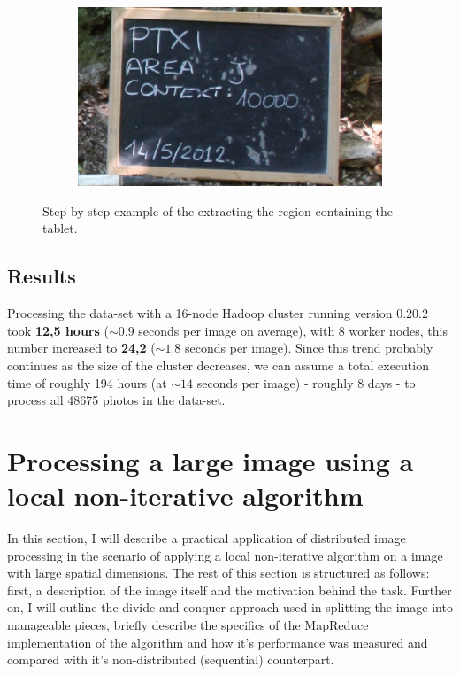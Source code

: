 \documentclass [12pt,a4paper]{report}
\begin{document}
\begin{figure}[h]
\begin{subfigure}{.5\textwidth}
	\caption{}
	\label{fig_bounding_box_small}
\end{subfigure}
\\
\begin{subfigure}{1.0\textwidth}
  \centering
  \includegraphics[scale=0.3]{box_extracted.eps} %
  \caption{}
	\label{fig_box_extracted_small}
\end{subfigure}
\caption{Step-by-step example of the extracting the region containing the tablet.}
\label{fig_pipeline_examples}
\end{figure}

\subsection{Results}

Processing the data-set with a 16-node Hadoop cluster running version 0.20.2 took \textbf{12,5 hours} ($\sim0.9$ seconds per image on average), with 8 worker nodes, this number increased to \textbf{24,2} ($\sim1.8$ seconds per image). Since this trend probably continues as the size of the cluster decreases, we can assume a total execution time of roughly 194 hours (at $\sim14$ seconds per image) - roughly 8 days - to process all 48675 photos in the data-set.

\section{Processing a large image using a local non-iterative algorithm}

In this section, I will describe a practical application of distributed image processing in the scenario of applying a local non-iterative algorithm on a image with large spatial dimensions. The rest of this section is structured as follows: first, a description of the image itself and the motivation behind the task. Further on, I will outline the divide-and-conquer approach used in splitting the image into manageable pieces, briefly describe the specifics of the MapReduce implementation of the algorithm and how it's performance was measured and compared with it's non-distributed (sequential) counterpart.
\end{document}
